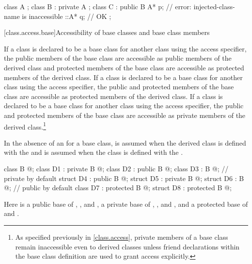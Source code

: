 \begin{example}
\begin{codeblock}
class A { };
class B : private A { };
class C : public B {
  A* p;             // error: injected-class-name  is inaccessible
  ::A* q;           // OK
};
\end{codeblock}
\end{example}

[class.access.base]{Accessibility of base classes and base class members}%
%
%
%
%

\pnum
If a class is declared to be a base class for another class using the
access specifier, the
public members of the base class are accessible as
public members of the derived class and
protected members of the base class are accessible as
protected members of the derived class.
If a class is declared to be a base class for another class using the
access specifier, the
public and protected members of the base class are accessible as
protected members of the derived class.
If a class is declared to be a base class for another class using the
access specifier, the
public and protected
members of the base class are accessible as private
members of the derived class.\footnote{As specified previously in \ref{class.access},
private members of a base class remain inaccessible even to derived classes
unless friend
declarations within the base class definition are used to grant access explicitly.}

\pnum
In the absence of an
for a base class,
is assumed when the derived class is
defined with the 
and
is assumed when the class is
defined with the 
.
\begin{example}
\begin{codeblock}
class B { @\commentellip@ };
class D1 : private B { @\commentellip@ };
class D2 : public B { @\commentellip@ };
class D3 : B { @\commentellip@ };             //  private by default
struct D4 : public B { @\commentellip@ };
struct D5 : private B { @\commentellip@ };
struct D6 : B { @\commentellip@ };            //  public by default
class D7 : protected B { @\commentellip@ };
struct D8 : protected B { @\commentellip@ };
\end{codeblock}

Here
is a public base of
,
,
and
,
a private base of
,
,
and
,
and a protected base of
and
.
\end{example}

